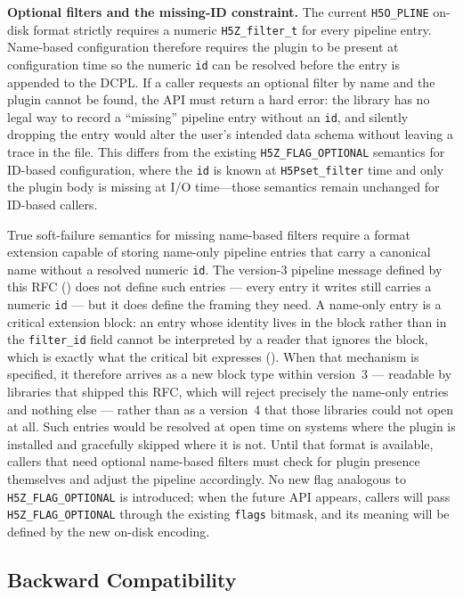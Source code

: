 \documentclass[../RFC-HDFG-2026-001.tex]{subfiles}
\begin{document}
\textbf{Optional filters and the missing-ID constraint.}  The current
\texttt{H5O\_PLINE} on-disk format strictly requires a numeric
\texttt{H5Z\_filter\_t} for every pipeline entry.  Name-based
configuration therefore requires the plugin to be present at
configuration time so the numeric \texttt{id} can be resolved before
the entry is appended to the DCPL.  If a caller requests an optional
filter by name and the plugin cannot be found, the API must return a
hard error: the library has no legal way to record a ``missing''
pipeline entry without an \texttt{id}, and silently dropping the
entry would alter the user's intended data schema without leaving a
trace in the file.  This differs from the existing
\texttt{H5Z\_FLAG\_OPTIONAL} semantics for ID-based configuration,
where the \texttt{id} is known at \texttt{H5Pset\_filter} time and
only the plugin body is missing at I/O time---those semantics remain
unchanged for ID-based callers.

True soft-failure semantics for missing name-based filters require a
format extension capable of storing name-only pipeline entries that
carry a canonical name without a resolved numeric \texttt{id}.  The
version-3 pipeline message defined by this RFC
() does not define such entries --- every entry
it writes still carries a numeric \texttt{id} --- but it does define the
framing they need.  A name-only entry is a critical extension block: an
entry whose identity lives in the block rather than in the
\texttt{filter\_id} field cannot be interpreted by a reader that ignores
the block, which is exactly what the critical bit expresses
().  When that mechanism is specified,
it therefore arrives as a new block type within version~3 --- readable
by libraries that shipped this RFC, which will reject precisely the
name-only entries and nothing else --- rather than as a version~4 that
those libraries could not open at all.
Such entries would be resolved at open time on systems where the
plugin is installed and gracefully skipped where it is not.  Until
that format is available, callers that need optional name-based
filters must check for plugin presence themselves and adjust the
pipeline accordingly.  No new flag analogous to
\texttt{H5Z\_FLAG\_OPTIONAL} is introduced; when the future API
appears, callers will pass \texttt{H5Z\_FLAG\_OPTIONAL} through the
existing \texttt{flags} bitmask, and its meaning will be defined by
the new on-disk encoding.

\subsection{Backward Compatibility}
\end{document}
